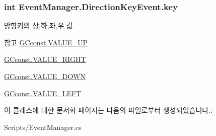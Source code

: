 \subsubsection[{key}]{\setlength{\rightskip}{0pt plus 5cm}int Event\+Manager.\+Direction\+Key\+Event.\+key}\label{class_event_manager_1_1_direction_key_event_abb8a5f31e506640b8b8ef049ef848607}
방향키의 상,하,좌,우 값 \begin{DoxySeeAlso}{참고}
\hyperlink{class_g_cconst_a5cc16bbe1d7540c883cc97a9dabbda20}{G\+Cconst.\+V\+A\+L\+U\+E\+\_\+\+U\+P} 

\hyperlink{class_g_cconst_ad572252971cc0adfaf37afda6b160bb4}{G\+Cconst.\+V\+A\+L\+U\+E\+\_\+\+R\+I\+G\+H\+T} 

\hyperlink{class_g_cconst_acfcbfa00f9a29aae8b79a1bc6f87ffb4}{G\+Cconst.\+V\+A\+L\+U\+E\+\_\+\+D\+O\+W\+N} 

\hyperlink{class_g_cconst_a3907d5bdd4ff673e4a57380a701bf110}{G\+Cconst.\+V\+A\+L\+U\+E\+\_\+\+L\+E\+F\+T} 
\end{DoxySeeAlso}


이 클래스에 대한 문서화 페이지는 다음의 파일로부터 생성되었습니다.\+:\begin{DoxyCompactItemize}
\item 
Scripts/Event\+Manager.\+cs\end{DoxyCompactItemize}
